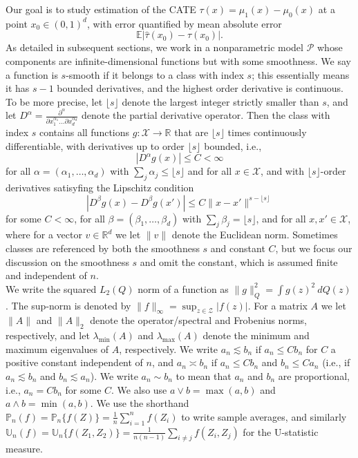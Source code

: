 \documentclass[11pt,twoside]{article}
\newcommand{\Pn}{\mathbb{P}_n}
\newcommand{\Un}{\mathbb{U}_n}
\newcommand{\E}{\mathbb{E}}
\newcommand{\R}{\mathbb{R}}
\newcommand{\Holder}{\text{H\"{o}lder}}
\theoremstyle{definition}
\theoremstyle{remark}
\begin{document}
Our goal is to study estimation of the CATE $\tau(x)=\mu_1(x)-\mu_0(x)$ at a point $x_0 \in (0,1)^d$, with error quantified by mean absolute error 
$$ \E \left| \widehat\tau(x_0) - \tau(x_0) \right| . $$
As detailed in subsequent sections, we work  in a nonparametric model $\mathcal{P}$ whose components are infinite-dimensional functions but with some smoothness. 
We say a function is $s$-smooth if it belongs to a \Holder{} class with index $s$; this  essentially means it has $s-1$ bounded derivatives, and the highest order derivative is continuous. To be more precise, let $\lfloor s \rfloor$ denote the largest integer strictly smaller than $s$, and let $D^\alpha = \frac{\partial^\alpha }{\partial x_1^{\alpha_1} \dots \partial x_d^{\alpha_d}}$ denote the partial derivative operator. Then the \Holder{} class with index $s$ contains all functions $g: \mathcal{X} \rightarrow \R$ that are $\lfloor s \rfloor$ times continuously differentiable, with derivatives up to order $\lfloor s \rfloor$ bounded, i.e., 
$$  \left| D^\alpha g(x) \right| \leq C < \infty $$
for all $\alpha=(\alpha_1,\dots,\alpha_d)$ with $\sum_j \alpha_j \leq \lfloor s \rfloor$ and for all $x \in \mathcal{X}$, and with $\lfloor s \rfloor$-order derivatives satisyfing the Lipschitz condition
$$ \left| D^\beta g(x) - D^\beta g(x') \right| \leq C \| x - x' \|^{s-\lfloor s \rfloor}  $$
for some $C<\infty$, for all  $\beta=(\beta_1,\dots,\beta_d)$ with $\sum_j \beta_j = \lfloor s \rfloor$, and for all $x,x' \in \mathcal{X}$, where for a vector $v \in \R^d$ we let $\|v \|$ denote the Euclidean norm.  Sometimes \Holder{} classes are referenced by both the smoothness $s$ and constant $C$, but we focus our discussion on the smoothness $s$ and omit the constant, which is assumed finite and independent of $n$. \\

We write the squared $L_2(Q)$ norm of a function as $\| g \|_{Q}^2 = { \int g(z)^2 \ dQ(z)}$. The sup-norm is denoted by $\|f \|_\infty = \sup_{z \in \mathcal{Z}} | f(z) |$. For a matrix $A$ we let $\| A \|$ and $\| A \|_2$ denote the operator/spectral and Frobenius norms, respectively, and let $\lambda_{\min}(A)$ and $\lambda_{\max}(A)$ denote the minimum and maximum eigenvalues of $A$, respectively. We write $a_n \lesssim b_n$ if $a_n \leq C b_n$ for $C$ a positive constant independent of $n$, and $a_n \asymp b_n$ if $a_n \leq C b_n$ and $b_n \leq C a_n$ (i.e., if $a_n \lesssim b_n$ and $b_n \lesssim a_n$).  We write $a_n \sim b_n$ to mean that $a_n$ and $b_n$ are proportional, i.e., $a_n= C b_n$ for some $C$. We also use $a \vee b = \max(a,b)$ and $a \wedge b = \min(a,b)$. We use the shorthand $\Pn(f) = \Pn\{f(Z)\} = \frac{1}{n} \sum_{i=1}^n f(Z_i)$ to write sample averages, and similarly $\Un(f) = \Un\{f(Z_1,Z_2)\}=\frac{1}{n(n-1)} \sum_{i \neq j} f(Z_i,Z_j)$ for the U-statistic measure. \\
\end{document}
